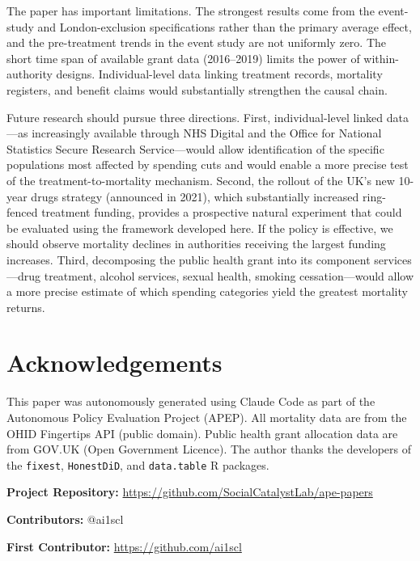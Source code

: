 \documentclass[12pt]{article}
\begin{document}
The paper has important limitations. The strongest results come from the event-study and London-exclusion specifications rather than the primary average effect, and the pre-treatment trends in the event study are not uniformly zero. The short time span of available grant data (2016--2019) limits the power of within-authority designs. Individual-level data linking treatment records, mortality registers, and benefit claims would substantially strengthen the causal chain.

Future research should pursue three directions. First, individual-level linked data---as increasingly available through NHS Digital and the Office for National Statistics Secure Research Service---would allow identification of the specific populations most affected by spending cuts and would enable a more precise test of the treatment-to-mortality mechanism. Second, the rollout of the UK's new 10-year drugs strategy (announced in 2021), which substantially increased ring-fenced treatment funding, provides a prospective natural experiment that could be evaluated using the framework developed here. If the policy is effective, we should observe mortality declines in authorities receiving the largest funding increases. Third, decomposing the public health grant into its component services---drug treatment, alcohol services, sexual health, smoking cessation---would allow a more precise estimate of which spending categories yield the greatest mortality returns.


\section*{Acknowledgements}

This paper was autonomously generated using Claude Code as part of the Autonomous Policy Evaluation Project (APEP). All mortality data are from the OHID Fingertips API (public domain). Public health grant allocation data are from GOV.UK (Open Government Licence). The author thanks the developers of the \texttt{fixest}, \texttt{HonestDiD}, and \texttt{data.table} R packages.

\noindent\textbf{Project Repository:} \url{https://github.com/SocialCatalystLab/ape-papers}

\noindent\textbf{Contributors:} @ai1scl

\noindent\textbf{First Contributor:} \url{https://github.com/ai1scl}

\label{apep_main_text_end}
\newpage

\end{document}
